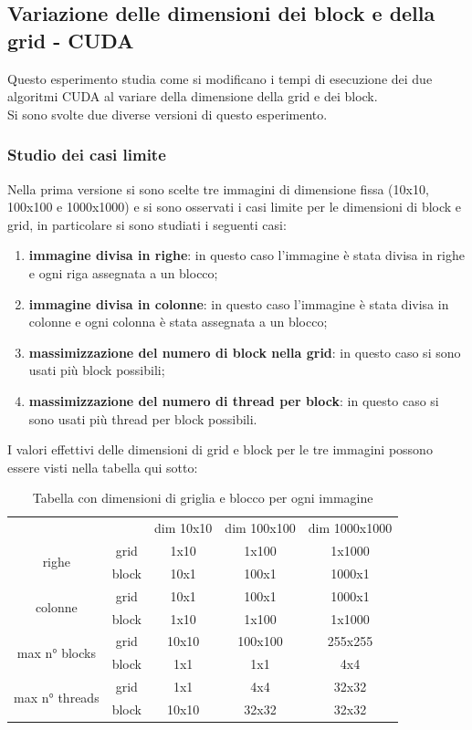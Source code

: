 \documentclass[10pt,twocolumn,letterpaper]{article}
\begin{document}
\subsection{Variazione delle dimensioni dei block e della grid - CUDA}
Questo esperimento studia come si modificano i tempi di esecuzione dei due algoritmi CUDA al variare della dimensione della grid e dei block.\\
Si sono svolte due diverse versioni di questo esperimento.\\

\subsubsection{Studio dei casi limite}
Nella prima versione si sono scelte tre immagini di dimensione fissa (10x10, 100x100 e 1000x1000) e si sono osservati i casi limite per le dimensioni di block e grid, in particolare si sono studiati i seguenti casi:
\begin{enumerate}[-]
\item{\textbf{immagine divisa in righe}: in questo caso l'immagine è stata divisa in righe e ogni riga assegnata a un blocco;}
\item{\textbf{immagine divisa in colonne}: in questo caso l'immagine è stata divisa in colonne e ogni colonna è stata assegnata a un blocco;}
\item{\textbf{massimizzazione del numero di block nella grid}: in questo caso si sono usati più block possibili;}
\item{\textbf{massimizzazione del numero di thread per block}: in questo caso si sono usati più thread per block possibili.}
\end{enumerate}
I valori effettivi delle dimensioni di grid e block per le tre immagini possono essere visti nella tabella qui sotto:
\begin{table}[H]
\centering
\begin{tabular}{ |cc||c|c|c| } 
\hline
& & \multirow{2}{3em}{dim 10x10} & \multirow{2}{4em}{dim 100x100} & \multirow{2}{4em}{dim 1000x1000} \\
& & & & \\
\hline
\hline
\multirow{2}{3em}{righe} & grid & 1x10 & 1x100 & 1x1000 \\\cline{2-5} 
 & block & 10x1 & 100x1 & 1000x1 \\
\hline
\hline
\multirow{2}{3em}{colonne} & grid & 10x1 & 100x1 & 1000x1 \\\cline{2-5}
 & block & 1x10 & 1x100 & 1x1000 \\ 
\hline
\hline
\multirow{2}{3em}{max n° blocks} & grid & 10x10 & 100x100 & 255x255 \\\cline{2-5}
 & block & 1x1 & 1x1 & 4x4 \\
\hline
\hline
\multirow{2}{3em}{max n° threads} & grid & 1x1 & 4x4 & 32x32 \\\cline{2-5}
 & block & 10x10 & 32x32 & 32x32 \\ 
\hline
\end{tabular}
\caption{Tabella con dimensioni di griglia e blocco per ogni immagine}
\label{tab1}
\end{table}
\end{document}
